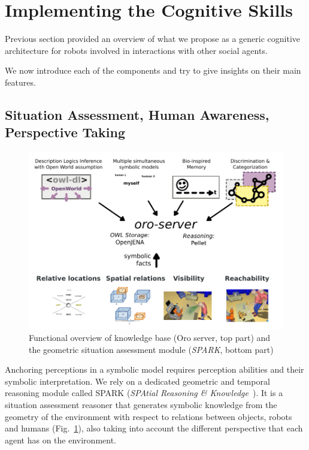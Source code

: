 \documentclass[preprint,5p]{elsarticle}
\begin{document}
\section{Implementing the Cognitive Skills}

Previous section provided an overview of what we propose as a generic cognitive
architecture for robots involved in interactions with other social agents.

We now introduce each of the components and try to give insights on their main
features.


\subsection{Situation Assessment, Human Awareness, Perspective Taking}
\label{sect|sit-ass}

\begin{figure}
        \centering
        \includegraphics[width=\columnwidth]{spark-oro}
    \caption{Functional overview of knowledge base ({\sc Oro} server, top part) and the geometric situation assessment module (\emph{SPARK}, bottom part)}
        \label{fig|spark-oro}
\end{figure}

Anchoring perceptions in a symbolic model requires perception abilities and
their symbolic interpretation. We rely on a dedicated geometric and temporal
reasoning module called SPARK (\emph{SPAtial Reasoning \&
Knowledge}~\cite{Sisbot2011}). It is a situation assessment reasoner that
generates symbolic knowledge from the geometry of the environment with respect
to relations between objects, robots and humans (Fig.~\ref{fig|spark-oro}),
also taking into account the different perspective that each agent has on the
environment.
\end{document}
